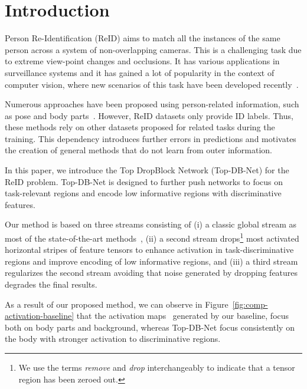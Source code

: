 \documentclass[a4paper,conference]{IEEEtran}
\begin{document}
\IEEEpeerreviewmaketitle
 
\section{Introduction}
 
Person Re-Identification (ReID) aims to match all the instances of the same person across a system of non-overlapping cameras. This is a challenging task due to extreme view-point changes and occlusions. It has various applications in surveillance systems and it has gained a lot of popularity in the context of computer vision, where new scenarios of this task have been developed recently~\cite{zhou2018vehicle,liu2016large,zhang2019mvb}.
 
Numerous approaches have been proposed using person-related information, such as pose and body parts~\cite{quispe2019improved,kumar2017pose,zheng2019pose,li2017learning,cheng2016person}. However, ReID datasets only provide ID labels. Thus, these methods rely on other datasets proposed for related tasks during the training. This dependency introduces further errors in predictions and motivates the creation of general methods that do not learn from outer information.
 
In this paper, we introduce the Top DropBlock Network (Top-DB-Net) for the ReID problem. Top-DB-Net is designed to further push networks to focus on task-relevant regions and encode low informative regions with discriminative features.
 
Our method is based on three streams consisting of (i) a classic global stream as most of the state-of-the-art methods~\cite{quispe2019improved,kumar2017pose,zheng2019pose,li2017learning,cheng2016person, dai2019batch,luo2019bag}, (ii) a second stream drops\footnote{We use the terms {\it remove} and {\it drop} interchangeably to indicate that a tensor region has been zeroed out.} most activated horizontal stripes of feature tensors to enhance activation in task-discriminative regions and improve encoding of low informative regions, and (iii) a third stream regularizes the second stream avoiding that noise generated by dropping features degrades the final results.
 
As a result of our proposed method, we can observe in Figure~\ref{fig:comp-activation-baseline} that the activation maps~\cite{zagoruyko2016paying} generated by our baseline, focus both on body parts and background, whereas Top-DB-Net focus consistently on the body with stronger activation to discriminative regions.
 
\end{document}
